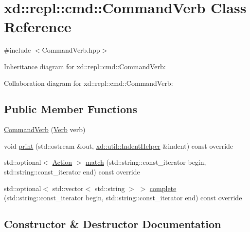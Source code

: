 \hypertarget{classxd_1_1repl_1_1cmd_1_1_command_verb}{}\section{xd\+:\+:repl\+:\+:cmd\+:\+:Command\+Verb Class Reference}
\label{classxd_1_1repl_1_1cmd_1_1_command_verb}


{\ttfamily \#include $<$Command\+Verb.\+hpp$>$}



Inheritance diagram for xd\+:\+:repl\+:\+:cmd\+:\+:Command\+Verb\+:


Collaboration diagram for xd\+:\+:repl\+:\+:cmd\+:\+:Command\+Verb\+:
\subsection*{Public Member Functions}
\begin{DoxyCompactItemize}
\item 
\mbox{\hyperlink{classxd_1_1repl_1_1cmd_1_1_command_verb_afaed6f03ddf8f542220c2cd0ceb34ee8}{Command\+Verb}} (\mbox{\hyperlink{classxd_1_1repl_1_1cmd_1_1_verb}{Verb}} verb)
\item 
void \mbox{\hyperlink{classxd_1_1repl_1_1cmd_1_1_command_verb_a63744f7758a04b9752e70d6b7e2697a8}{print}} (std\+::ostream \&out, \mbox{\hyperlink{classxd_1_1util_1_1_indent_helper}{xd\+::util\+::\+Indent\+Helper}} \&indent) const override
\item 
std\+::optional$<$ \mbox{\hyperlink{namespacexd_1_1repl_1_1cmd_a7274841bd02a9c5da0ba48ae204ab3d5}{Action}} $>$ \mbox{\hyperlink{classxd_1_1repl_1_1cmd_1_1_command_verb_ab0c91becdb62c517f88800e992b3548f}{match}} (std\+::string\+::const\+\_\+iterator begin, std\+::string\+::const\+\_\+iterator end) const override
\item 
std\+::optional$<$ std\+::vector$<$ std\+::string $>$ $>$ \mbox{\hyperlink{classxd_1_1repl_1_1cmd_1_1_command_verb_a4e9a0a2ba602a7d7e3802822a6063dff}{complete}} (std\+::string\+::const\+\_\+iterator begin, std\+::string\+::const\+\_\+iterator end) const override
\end{DoxyCompactItemize}


\subsection{Constructor \& Destructor Documentation}
\mbox{\label{classxd_1_1repl_1_1cmd_1_1_command_verb_afaed6f03ddf8f542220c2cd0ceb34ee8}} 
